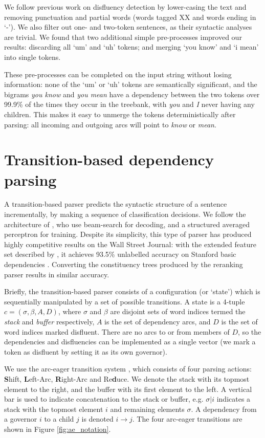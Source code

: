 \documentclass[11pt,letterpaper]{article}
\begin{document}
We follow previous work on disfluency detection by lower-casing the text and
removing punctuation and partial words (words tagged XX and words ending in
`-').  We also filter out one- and two-token sentences, as their syntactic
analyses are trivial.
We found that two additional simple pre-processes improved our results: discarding
all `um' and `uh' tokens; and merging `you know' and `i mean' into single tokens.

These pre-processes can be completed on the input string without losing information:
none of the `um' or `uh' tokens are semantically significant, and
the bigrams \emph{you know} and \emph{you mean} have a dependency between the two
tokens over 99.9\% of the times they occur in the treebank, with \emph{you} and \emph{I}
never having any children. This makes it easy to unmerge the tokens deterministically
after parsing:
all incoming and outgoing arcs will point to \emph{know} or \emph{mean}.


\section{Transition-based dependency parsing}

A transition-based parser predicts the syntactic structure of a sentence incrementally,
by making a sequence of classification decisions.  We follow the architecture of
\citet{zhang:cl11}, who use beam-search for decoding, and a structured averaged
perceptron for training.  Despite its simplicity, this type of parser
has produced highly competitive results on the Wall Street Journal: with the
extended feature set described by \citet{zhang:11}, it achieves 93.5\%
unlabelled accuracy on Stanford basic dependencies \citep{stanford_deps}.  Converting
the constituency trees produced by the \citet{Charniak05a} reranking parser
results in similar accuracy.

Briefly, the transition-based parser consists of a configuration (or `state') which
is sequentially manipulated by a set of possible transitions.  A state is a 4-tuple
$c = (\sigma, \beta, A, D)$, where $\sigma$ and $\beta$ are disjoint sets of word
indices termed the \emph{stack} and \emph{buffer} respectively, $A$ is the set of
dependency arcs, and $D$ is the set of word indices marked disfluent.  There are no
arcs to or from members of $D$, so the dependencies and disfluencies can be
implemented as a single vector (we mark a token as disfluent by setting it as its
own governor).

We use the arc-eager transition system \citep{nivre:03,nivre:cl}, which consists
of four parsing actions:  \textbf{S}hift, \textbf{L}eft-Arc,
\textbf{R}ight-Arc and Re\textbf{d}uce.
We denote the stack with its topmost element
to the right, and the buffer with its first element to the left. A vertical bar
is used to indicate concatenation to the stack or buffer, e.g. $\sigma | i$ indicates
a stack with the topmost element $i$ and remaining elements $\sigma$.  
A dependency from a governor $i$ to a child $j$ is denoted $i \rightarrow j$.
The four arc-eager transitions are shown in Figure \ref{fig:ae_notation}.
\end{document}
